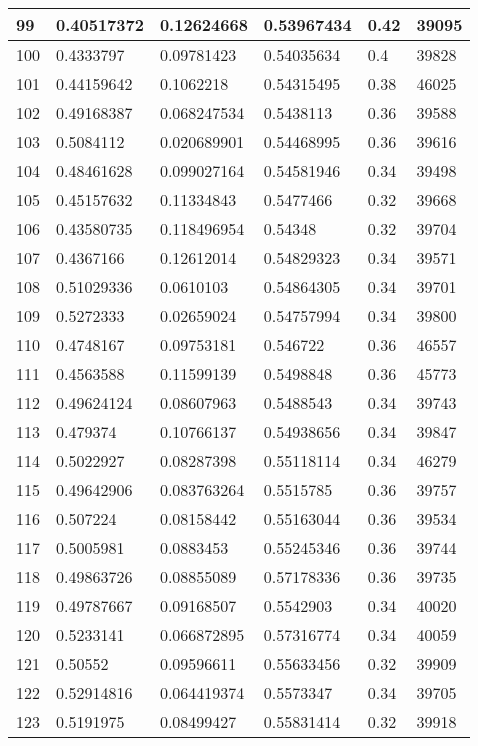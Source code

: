 \begin{longtable}{|l|l|l|l|l|l|}
99 & 0.40517372 & 0.12624668 & 0.53967434 & 0.42 & 39095 \\ \hline 
100 & 0.4333797 & 0.09781423 & 0.54035634 & 0.4 & 39828 \\ \hline 
101 & 0.44159642 & 0.1062218 & 0.54315495 & 0.38 & 46025 \\ \hline 
102 & 0.49168387 & 0.068247534 & 0.5438113 & 0.36 & 39588 \\ \hline 
103 & 0.5084112 & 0.020689901 & 0.54468995 & 0.36 & 39616 \\ \hline 
104 & 0.48461628 & 0.099027164 & 0.54581946 & 0.34 & 39498 \\ \hline 
105 & 0.45157632 & 0.11334843 & 0.5477466 & 0.32 & 39668 \\ \hline 
106 & 0.43580735 & 0.118496954 & 0.54348 & 0.32 & 39704 \\ \hline 
107 & 0.4367166 & 0.12612014 & 0.54829323 & 0.34 & 39571 \\ \hline 
108 & 0.51029336 & 0.0610103 & 0.54864305 & 0.34 & 39701 \\ \hline 
109 & 0.5272333 & 0.02659024 & 0.54757994 & 0.34 & 39800 \\ \hline 
110 & 0.4748167 & 0.09753181 & 0.546722 & 0.36 & 46557 \\ \hline 
111 & 0.4563588 & 0.11599139 & 0.5498848 & 0.36 & 45773 \\ \hline 
112 & 0.49624124 & 0.08607963 & 0.5488543 & 0.34 & 39743 \\ \hline 
113 & 0.479374 & 0.10766137 & 0.54938656 & 0.34 & 39847 \\ \hline 
114 & 0.5022927 & 0.08287398 & 0.55118114 & 0.34 & 46279 \\ \hline 
115 & 0.49642906 & 0.083763264 & 0.5515785 & 0.36 & 39757 \\ \hline 
116 & 0.507224 & 0.08158442 & 0.55163044 & 0.36 & 39534 \\ \hline 
117 & 0.5005981 & 0.0883453 & 0.55245346 & 0.36 & 39744 \\ \hline 
118 & 0.49863726 & 0.08855089 & 0.57178336 & 0.36 & 39735 \\ \hline 
119 & 0.49787667 & 0.09168507 & 0.5542903 & 0.34 & 40020 \\ \hline 
120 & 0.5233141 & 0.066872895 & 0.57316774 & 0.34 & 40059 \\ \hline 
121 & 0.50552 & 0.09596611 & 0.55633456 & 0.32 & 39909 \\ \hline 
122 & 0.52914816 & 0.064419374 & 0.5573347 & 0.34 & 39705 \\ \hline 
123 & 0.5191975 & 0.08499427 & 0.55831414 & 0.32 & 39918 \\ \hline 

\end{longtable}

